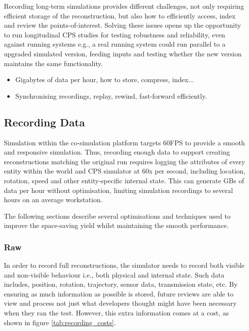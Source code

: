 Recording long-term simulations provides different challenges, not only requiring efficient storage of the reconstruction, but also how to efficiently access, index and review the points-of-interest. Solving these issues opens up the opportunity to run longitudinal CPS studies for testing robustness and reliability, even against running systems e.g., a real running system could run parallel to a upgraded simulated version, feeding inputs and testing whether the new version maintains the same functionality.

\begin{itemize}
  \item Gigabytes of data per hour, how to store, compress, index...
  \item Synchronising recordings, replay, rewind, fast-forward efficiently.
\end{itemize}

\subsection{Recording Data} %
\label{sub:recording_data}
Simulation within the co-simulation platform targets 60FPS to provide a smooth and responsive simulation. Thus, recording enough data to support creating reconstructions matching the original run requires logging the attributes of every entity within the world and CPS simulator at 60x per second, including location, rotation, speed and other entity-specific internal state. This can generate GBs of data per hour without optimisation, limiting simulation recordings to several hours on an average workstation.

The following sections describe several optimisations and techniques used to improve the space-saving yield whilst maintaining the smooth performance.
\subsubsection{Raw} %
\label{sub:raw}
In order to record full reconstructions, the simulator needs to record both visible and non-visible behaviour i.e., both physical and internal state. Such data includes, position, rotation, trajectory, sensor data, transmission state, etc. By ensuring as much information as possible is stored, future reviews are able to view and process not just what developers thought might have been necessary when they ran the test. However, this extra information comes at a cost, as shown in figure \ref{tab:recording_costs}.

